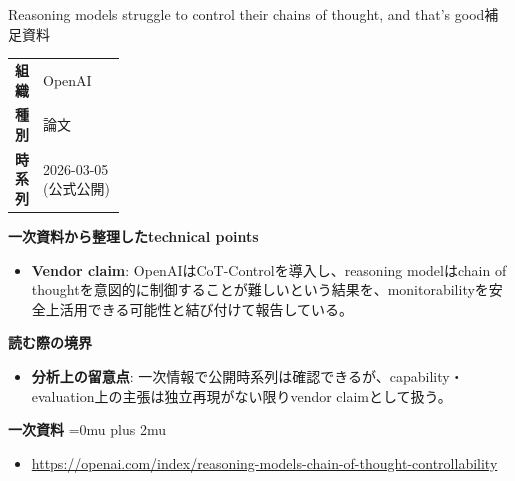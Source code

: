 \begin{technicalnote}{Reasoning models struggle to control their chains of thought, and that’s good}{補足資料}
\begingroup
\begin{tabularx}{\linewidth}{@{}>{\bfseries}p{0.22\linewidth}X@{}}
組織 & OpenAI \\
種別 & 論文 \\
時系列 & 2026-03-05 (公式公開) \\
\end{tabularx}
\smallskip
{\bfseries 一次資料から整理したtechnical points}
\begin{itemize}[leftmargin=1.5em,itemsep=0.35em]
\item \textbf{Vendor claim}: OpenAIはCoT-Controlを導入し、reasoning modelはchain of thoughtを意図的に制御することが難しいという結果を、monitorabilityを安全上活用できる可能性と結び付けて報告している。
\end{itemize}
\begin{minipage}{\linewidth}
{\bfseries 読む際の境界}
\begin{itemize}[leftmargin=1.5em,itemsep=0.35em]
\item \textbf{分析上の留意点}: 一次情報で公開時系列は確認できるが、capability・evaluation上の主張は独立再現がない限りvendor claimとして扱う。
\end{itemize}
\begin{samepage}
{\bfseries 一次資料}
\begingroup\sloppy
\Urlmuskip=0mu plus 2mu\relax
\begin{itemize}[leftmargin=1.5em,itemsep=0.25em]
\item {\scriptsize\url{https://openai.com/index/reasoning-models-chain-of-thought-controllability}}
\end{itemize}
\endgroup
\end{samepage}
\end{minipage}
\endgroup
\end{technicalnote}
\medskip

